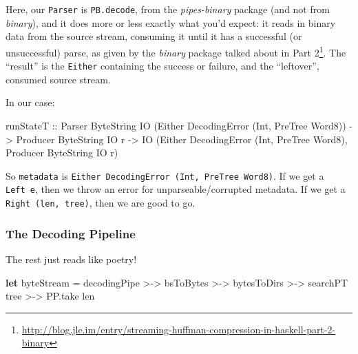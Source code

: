 \documentclass[]{article}
\newenvironment{Shaded}{}{}
\newcommand{\DataTypeTok}[1]{\textcolor[rgb]{0.56,0.13,0.00}{#1}}
\newcommand{\KeywordTok}[1]{\textcolor[rgb]{0.00,0.44,0.13}{\textbf{#1}}}
\newcommand{\NormalTok}[1]{#1}
\newcommand{\OperatorTok}[1]{\textcolor[rgb]{0.40,0.40,0.40}{#1}}
\newcommand{\OtherTok}[1]{\textcolor[rgb]{0.00,0.44,0.13}{#1}}
\renewcommand{\href}[2]{#2\footnote{\url{#1}}}
\begin{document}
Here, our \texttt{Parser} is \texttt{PB.decode}, from the \emph{pipes-binary}
package (and not from \emph{binary}), and it does more or less exactly what
you'd expect: it reads in binary data from the source stream, consuming it until
it has a successful (or unsuccessful) parse, as given by the \emph{binary}
package talked about in
\href{http://blog.jle.im/entry/streaming-huffman-compression-in-haskell-part-2-binary}{Part
2}. The ``result'' is the \texttt{Either} containing the success or failure, and
the ``leftover'', consumed source stream.

In our case:

\begin{Shaded}
\begin{Highlighting}[]
\NormalTok{runStateT}
\OtherTok{  ::} \DataTypeTok{Parser}   \DataTypeTok{ByteString} \DataTypeTok{IO}\NormalTok{ (}\DataTypeTok{Either} \DataTypeTok{DecodingError}\NormalTok{ (}\DataTypeTok{Int}\NormalTok{, }\DataTypeTok{PreTree} \DataTypeTok{Word8}\NormalTok{))}
  \OtherTok{{-}>} \DataTypeTok{Producer} \DataTypeTok{ByteString} \DataTypeTok{IO}\NormalTok{ r}
  \OtherTok{{-}>} \DataTypeTok{IO}\NormalTok{ (}\DataTypeTok{Either} \DataTypeTok{DecodingError}\NormalTok{ (}\DataTypeTok{Int}\NormalTok{, }\DataTypeTok{PreTree} \DataTypeTok{Word8}\NormalTok{), }\DataTypeTok{Producer} \DataTypeTok{ByteString} \DataTypeTok{IO}\NormalTok{ r)}
\end{Highlighting}
\end{Shaded}

So \texttt{metadata} is \texttt{Either\ DecodingError\ (Int,\ PreTree\ Word8)}.
If we get a \texttt{Left\ e}, then we throw an error for unparseable/corrupted
metadata. If we get a \texttt{Right\ (len,\ tree)}, then we are good to go.

\hypertarget{the-decoding-pipeline}{%
\subsubsection{The Decoding Pipeline}\label{the-decoding-pipeline}}

The rest just reads like poetry!

\begin{Shaded}
\begin{Highlighting}[]
\KeywordTok{let}\NormalTok{ byteStream }\OtherTok{=}\NormalTok{ decodingPipe }\OperatorTok{>{-}>}\NormalTok{ bsToBytes}
             \OperatorTok{>{-}>}\NormalTok{ bytesToDirs  }\OperatorTok{>{-}>}\NormalTok{ searchPT tree}
             \OperatorTok{>{-}>}\NormalTok{ PP.take len}
\end{Highlighting}
\end{Shaded}
\end{document}
